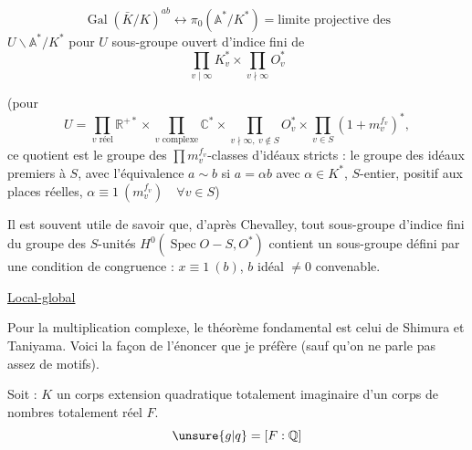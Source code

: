 

\[
\operatorname{Gal}(\bar K/K)^{ab}
\longleftrightarrow
\pi_0(\mathbb A^*/K^*)=\text{limite projective des}
\]
$U\backslash\mathbb A^*/K^*$ pour $U$ sous-groupe ouvert d'indice fini de
\[
\prod_{v\mid\infty}K_v^*\times
\prod_{v\nmid\infty}O_v^*
\]

(pour
\[
U=
\prod_{v\text{ réel}}\mathbb R^{+*}
\times\prod_{v\text{ complexe}}\mathbb C^*
\times\prod_{v\nmid\infty,\ v\notin S}O_v^*
\times\prod_{v\in S}(1+m_v^{f_v})^*,
\]
ce quotient est le groupe des $\prod m_v^{f_v}$-classes d'idéaux stricts : le groupe des idéaux premiers à $S$, avec l'équivalence $a\sim b$ si $a=\alpha b$ avec $\alpha\in K^*$, $S$-entier, positif aux places réelles, $\alpha\equiv1\ (m_v^{f_v})\quad\forall v\in S$)

Il est souvent utile de savoir que, d'après Chevalley, tout sous-groupe d'indice fini du groupe des $S$-unités $H^0(\operatorname{Spec}O-S,O^*)$  contient un sous-groupe défini par une condition de congruence : $x\equiv1\ (b)$, $b$ idéal $\ne0$ convenable.

\uline{Local-global}


\begin{center}
\end{center}

Pour la multiplication complexe, le théorème fondamental est celui de Shimura et Taniyama. Voici la façon de l'énoncer que je préfère (sauf qu'on ne parle pas assez de motifs).

Soit : $K$ un corps extension quadratique totalement imaginaire d'un corps de nombres totalement réel $F$.
\[
\unsure{g|q}=[F:\mathbb Q]
\]

